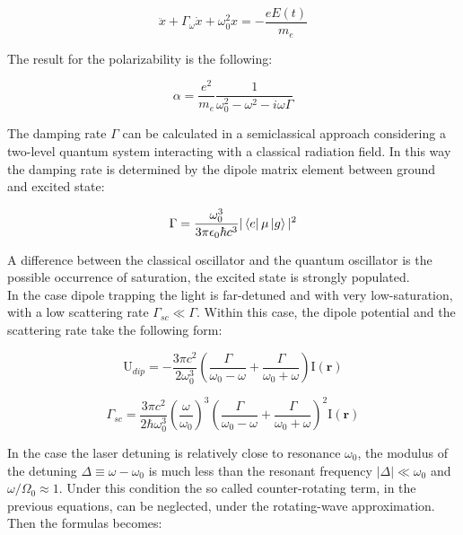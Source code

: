 \documentclass[../thesis.tex]{subfiles}
\begin{document}
\begin{equation}
\ddot{x} + \Gamma_{\omega} \dot{x} + \omega_0^2 x = -\frac{e E(t)}{m_e}
\end{equation}

The result for the polarizability is the following:

\begin{equation}
\alpha = \frac{e^2}{m_e} \frac{1}{\omega_0^2 - \omega^2 - i\omega \Gamma}
\end{equation}

The damping rate $\Gamma$ can be calculated in a semiclassical approach considering a two-level quantum system interacting with a classical radiation field. In this way the damping rate is determined by the dipole matrix element between ground and excited state:

\begin{equation}
\Gamma = \frac{\omega_0^3}{3 \pi \epsilon_0 \hbar c^3} |\bra{e} \mu \ket{g}|^2
\end{equation}

A difference between the classical oscillator and the quantum oscillator is the possible occurrence of saturation, the excited state is strongly populated.\\
In the case dipole trapping the light is far-detuned and with very low-saturation, with a low scattering rate $\Gamma_{sc} \ll \Gamma$. Within this case, the dipole potential and the scattering rate take the following form:

\begin{equation}
\text{U}_{dip} = - \frac{3 \pi c^2}{2 \omega_0^3} \left( \frac{\Gamma}{\omega_0 - \omega} + \frac{\Gamma}{\omega_0 + \omega} \right) \text{I}(\textbf{r})
\end{equation}

\begin{equation}
\Gamma_{sc} =  \frac{3 \pi c^2}{2 \hbar \omega_0^3} \left( \frac{\omega}{\omega_0} \right)^3 \left( \frac{\Gamma}{\omega_0 - \omega} + \frac{\Gamma}{\omega_0 + \omega} \right)^2 \text{I}(\textbf{r})
\end{equation}

In the case the laser detuning is relatively close to resonance $\omega_0$, the modulus of the detuning $\Delta \equiv \omega - \omega_0$ is much less than the resonant frequency $|\Delta| \ll \omega_0$ and $\omega / \Omega_0 \approx 1$. Under this condition the so called counter-rotating term, in the previous equations, can be neglected, under the rotating-wave approximation. Then the formulas becomes:
\end{document}
